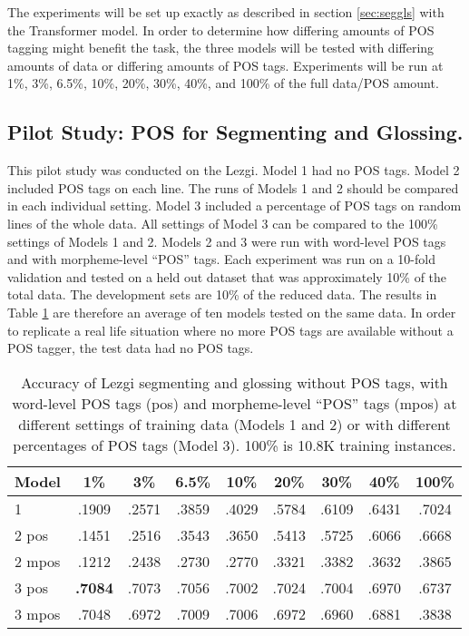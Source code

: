 The experiments will be set up exactly as described in section \ref{sec:seggls} with the Transformer model. In order to determine how differing amounts of POS tagging might benefit the task, the three models will be tested with differing amounts of data or differing amounts of POS tags. Experiments will be run at 1\%, 3\%, 6.5\%, 10\%, 20\%, 30\%, 40\%, and 100\% of the full data/POS amount. 

\subsection{Pilot Study: POS for Segmenting and Glossing.}

This pilot study was conducted on the Lezgi. Model 1 had no POS tags. Model 2 included POS tags on each line. The runs of Models 1 and 2 should be compared in each individual setting. Model 3 included a percentage of POS tags on random lines of the whole data. All settings of Model 3 can be compared to the 100\% settings of Models 1 and 2. Models 2 and 3 were run with word-level POS tags and with morpheme-level ``POS'' tags. Each experiment was run on a 10-fold validation and tested on a held out dataset that was approximately 10\% of the total data. The development sets are 10\% of the reduced data. The results in Table \ref{tab:POSSG} are therefore an average of ten models tested on the same data. In order to replicate a real life situation where no more POS tags are available without a POS tagger, the test data had no POS tags. 

\begin{table}[]
    \centering
    \begin{tabular}{l|cccccccc}
       \textbf{Model} & \textbf{1\%} & \textbf{3\%} & \textbf{6.5\%} & \textbf{10\%} & \textbf{20\%} & \textbf{30\%} & \textbf{40\%} & \textbf{100\%} \\
      \hline
       1       & .1909 & .2571 & .3859 & .4029 & .5784 & .6109 & .6431 & .7024   \\
       \hline
       2 pos   & .1451 & .2516 & .3543 & .3650 & .5413 & .5725 & .6066 & .6668  \\
       2 mpos  & .1212 & .2438 & .2730 & .2770 & .3321 & .3382 & .3632 & .3865  \\
       \hline
       3 pos   & \textbf{.7084} & .7073 & .7056 & .7002 & .7024 & .7004 & .6970 & .6737  \\
       3 mpos  & .7048 & .6972  & .7009 & .7006 & .6972 & .6960 & .6881 & .3838  \\
    \end{tabular}
    \caption[Segmenting and Glossing with/out POS tags]{Accuracy of Lezgi segmenting and glossing without POS tags, with word-level POS tags (pos) and morpheme-level ``POS'' tags (mpos)  at different settings of training data (Models 1 and 2) or with different percentages of POS tags (Model 3). 100\% is 10.8K training instances.}
    \label{tab:POSSG}
\end{table}

